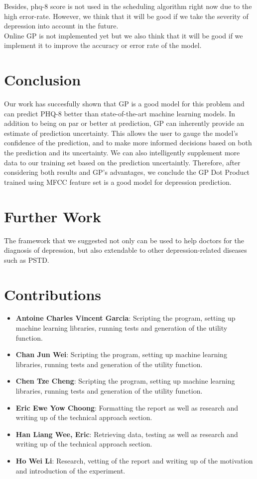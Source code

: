 \documentclass{article}
\begin{document}
	Besides, phq-8 score is not used in the scheduling algorithm right now due to the high error-rate. However, we think that it will be good if we take 
	the severity of depression into account in the future. \\

	Online GP is not implemented yet but we also think that it will be good if we implement it to improve the accuracy or error rate of the model.
	
	\section{Conclusion}	
	Our work has succesfully shown that GP is a good model for this problem and can predict PHQ-8 better than state-of-the-art machine learning models. 
	In addition to being on par or better at prediction, GP can inherently provide an estimate of prediction uncertainty. 
	This allows the user to gauge the model's confidence of the prediction, and to make more informed decisions based on both the prediction and its uncertainty. 
	We can also intelligently supplement more data to our training set based on the prediction uncertaintly. 
	Therefore, after considering both results and GP's advantages, we conclude the GP Dot Product trained using MFCC feature set is a good model for 
	depression prediction.
	
	\section{Further Work}
	The framework that we suggested not only can be used to help doctors for the diagnosis of depression, but also extendable to other depression-related 
	diseases such as PSTD. 

	
	\section{Contributions}
	\begin{itemize}
		\item \textbf{Antoine Charles Vincent Garcia}: 
		Scripting the program, setting up machine learning libraries, running tests and generation of the utility function.
		\item \textbf{Chan Jun Wei}: 
		Scripting the program, setting up machine learning libraries, running tests and generation of the utility function.
		\item \textbf{Chen Tze Cheng}: 
		Scripting the program, setting up machine learning libraries, running tests and generation of the utility function.
		\item \textbf{Eric Ewe Yow Choong}: 
		Formatting the report as well as research and writing up of the technical approach section.
		\item \textbf{Han Liang Wee, Eric}: 
		Retrieving data, testing as well as research and writing up of the technical approach section.
		\item \textbf{Ho Wei Li}: 
		Research, vetting of the report and writing up of the motivation and introduction of the experiment. \\
	\end{itemize}
	
	
	{\scriptsize }
\end{document}
